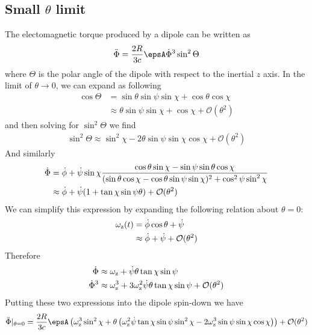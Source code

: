 \documentclass[/home/greg/Thesis/main/main.tex]{subfiles}
\begin{document}
\subsection{Small $\theta$ limit}
The electomagnetic torque produced by a dipole can be written as 
\begin{equation}
\Phiddot = \frac{2R}{3c}\epsA \Phidot^{3} \sin^{2}\Theta
\end{equation}
where $\Theta$ is the polar angle of the dipole with respect to the inertial
$z$ axis. In the limit of $\theta \rightarrow 0$, we can expand as following
\begin{align}
\cos\Theta &= \sin\theta \sin\psi \sin\chi + \cos\theta \cos \chi \\
& \approx \theta\sin\psi \sin\chi  + \cos\chi + \mathcal{O}(\theta^{2})
\end{align}
and then solving for $\sin^{2}\Theta$ we find
\begin{align}
\sin^{2}\Theta \approx \sin^{2}\chi - 2\theta \sin\psi \sin\chi\cos\chi + \mathcal{O}(\theta^{2})
\end{align}
And similarly 
\begin{align}
\dot{\Phi} &= \dot{\phi} + \dot{\psi} \sin\chi 
\frac{\cos\theta \sin\chi - \sin\psi \sin \theta \cos \chi}
{(\sin\theta\cos\chi - \cos\theta \sin \psi \sin \chi)^{2} + \cos^{2}\psi \sin^{2}\chi}
\\
& \approx \dot{\phi} + \dot{\psi} (1 + \tan\chi \sin\psi \theta) + \mathcal{O}(\theta^{2})
\end{align}
We can simplify this expression by expanding the following relation about 
$\theta=0$:
\begin{align}
\omega_{\mathrm{z}}(t) &= \dot{\phi} \cos\theta + \dot{\psi} \\
&\approx \dot{\phi} + \dot{\psi} + \mathcal{O}(\theta^{2})
\end{align}
Therefore
\begin{align}
\dot{\Phi} & \approx \omega_{\mathrm{z}} + \dot{\psi} \theta \tan \chi \sin\psi \\
\dot{\Phi}^{3} & \approx \omega_{\mathrm{z}}^{3} + 3 \omega_{\mathrm{z}}^{2}\dot{\psi}\theta \tan \chi \sin\psi +
\mathcal{O}(\theta^{2})
\end{align}
Putting these two expressions into the dipole spin-down we have
\begin{equation}
\Phiddot |_{\theta=0} = \frac{2R}{3c} \epsA \left(
\wz^{3} \sin^{2}\chi + \theta \left(
\wz^{2} \dot{\psi}\tan \chi \sin\psi \sin^{2}\chi - 2\wz^{3}\sin\psi\sin\chi\cos\chi\right)
\right) + \mathcal{O}(\theta^{2})
\end{equation}
\end{document}
